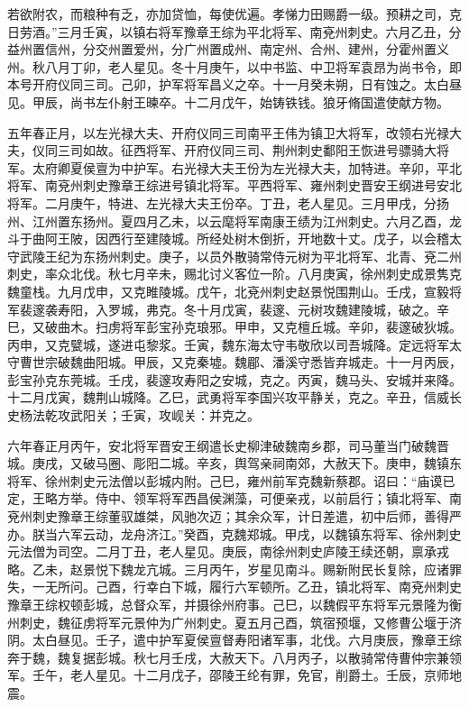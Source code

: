 \documentclass[12pt,UTF8]{ctexbook}
\begin{document}
若欲附农，而粮种有乏，亦加贷恤，每使优遍。孝悌力田赐爵一级。预耕之司，克日劳酒。”三月壬寅，以镇右将军豫章王综为平北将军、南兗州刺史。六月乙丑，分益州置信州，分交州置爱州，分广州置成州、南定州、合州、建州，分霍州置义州。秋八月丁卯，老人星见。冬十月庚午，以中书监、中卫将军袁昂为尚书令，即本号开府仪同三司。己卯，护军将军昌义之卒。十一月癸未朔，日有蚀之。太白昼见。甲辰，尚书左仆射王暕卒。十二月戊午，始铸铁钱。狼牙脩国遣使献方物。

五年春正月，以左光禄大夫、开府仪同三司南平王伟为镇卫大将军，改领右光禄大夫，仪同三司如故。征西将军、开府仪同三司、荆州刺史鄱阳王恢进号骠骑大将军。太府卿夏侯亶为中护军。右光禄大夫王份为左光禄大夫，加特进。辛卯，平北将军、南兗州刺史豫章王综进号镇北将军。平西将军、雍州刺史晋安王纲进号安北将军。二月庚午，特进、左光禄大夫王份卒。丁丑，老人星见。三月甲戌，分扬州、江州置东扬州。夏四月乙未，以云麾将军南康王绩为江州刺史。六月乙酉，龙斗于曲阿王陂，因西行至建陵城。所经处树木倒折，开地数十丈。戊子，以会稽太守武陵王纪为东扬州刺史。庚子，以员外散骑常侍元树为平北将军、北青、兗二州刺史，率众北伐。秋七月辛未，赐北讨义客位一阶。八月庚寅，徐州刺史成景隽克魏童栈。九月戊申，又克睢陵城。戊午，北兗州刺史赵景悦围荆山。壬戌，宣毅将军裴邃袭寿阳，入罗城，弗克。冬十月戊寅，裴邃、元树攻魏建陵城，破之。辛巳，又破曲木。扫虏将军彭宝孙克琅邪。甲申，又克檀丘城。辛卯，裴邃破狄城。丙申，又克甓城，遂进屯黎浆。壬寅，魏东海太守韦敬欣以司吾城降。定远将军太守曹世宗破魏曲阳城。甲辰，又克秦墟。魏郿、潘溪守悉皆弃城走。十一月丙辰，彭宝孙克东莞城。壬戌，裴邃攻寿阳之安城，克之。丙寅，魏马头、安城并来降。十二月戊寅，魏荆山城降。乙巳，武勇将军李国兴攻平静关，克之。辛丑，信威长史杨法乾攻武阳关；壬寅，攻岘关：并克之。

六年春正月丙午，安北将军晋安王纲遣长史柳津破魏南乡郡，司马董当门破魏晋城。庚戌，又破马圈、彫阳二城。辛亥，舆驾亲祠南郊，大赦天下。庚申，魏镇东将军、徐州刺史元法僧以彭城内附。己巳，雍州前军克魏新蔡郡。诏曰：“庙谟已定，王略方举。侍中、领军将军西昌侯渊藻，可便亲戎，以前启行；镇北将军、南兗州刺史豫章王综董驭雄桀，风驰次迈；其余众军，计日差遣，初中后师，善得严办。朕当六军云动，龙舟济江。”癸酉，克魏郑城。甲戌，以魏镇东将军、徐州刺史元法僧为司空。二月丁丑，老人星见。庚辰，南徐州刺史庐陵王续还朝，禀承戎略。乙未，赵景悦下魏龙亢城。三月丙午，岁星见南斗。赐新附民长复除，应诸罪失，一无所问。己酉，行幸白下城，履行六军顿所。乙丑，镇北将军、南兗州刺史豫章王综权顿彭城，总督众军，并摄徐州府事。己巳，以魏假平东将军元景隆为衡州刺史，魏征虏将军元景仲为广州刺史。夏五月己酉，筑宿预堰，又修曹公堰于济阴。太白昼见。壬子，遣中护军夏侯亶督寿阳诸军事，北伐。六月庚辰，豫章王综奔于魏，魏复据彭城。秋七月壬戌，大赦天下。八月丙子，以散骑常侍曹仲宗兼领军。壬午，老人星见。十二月戊子，邵陵王纶有罪，免官，削爵土。壬辰，京师地震。
\end{document}

